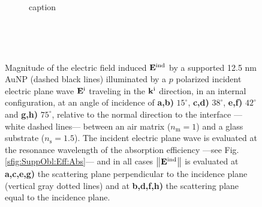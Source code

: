  \begin{figure}\centering
    \def\svgwidth{.7\textwidth}
    \scriptsize
    \\[-62.75em]
    \hspace*{-.255\textwidth}
        \begin{subfigure}{.25\textwidth}\caption{ } \label{sfig:Near:SuppObl:p:15:perp}\end{subfigure}%
        \begin{subfigure}{.3\textwidth}\caption{ }\label{sfig:Near:SuppObl:p:15:par}\end{subfigure}\\[12.8em]
    \hspace*{-.225\textwidth}
        \begin{subfigure}{.225\textwidth}\caption{ } \label{sfig:Near:SuppObl:p:38:perp}\end{subfigure}%
        \begin{subfigure}{.34\textwidth}\caption{ }\label{sfig:Near:SuppObl:p:38:par}\end{subfigure}\\[12.8em]
    \hspace*{-.225\textwidth}
        \begin{subfigure}{.225\textwidth}caption{ } \label{sfig:Near:SuppObl:p:42:perp}\end{subfigure}%
        \begin{subfigure}{.34\textwidth}\caption{ }\label{sfig:Near:SuppObl:p:42:par}\end{subfigure}\\[12.8em]
    \hspace*{-.225\textwidth}
        \begin{subfigure}{.225\textwidth}\caption{ } \label{sfig:Near:SuppObl:p:75:perp}\end{subfigure}%
        \begin{subfigure}{.34\textwidth}\caption{ }\label{sfig:Near:SuppObl:p:75:par}\end{subfigure}\\[15.75em]
    \caption[Induced Electric Field of a 12.5 nm Au NP on substrate illuminated at oblique incidence with a $p$ polarized electric field]{\footnotesize%
    Magnitude of the electric field induced $\vb{E}^\text{ind}$ by a supported 12.5 nm AuNP (dashed black lines) illuminated by a $p$ polarized incident electric plane wave $\vb{E}^\text{i}$ traveling in the $\vb{k}^\text{i}$ direction, in an internal configuration, at an angle of incidence of \textbf{a,b)} $15^\circ$, \textbf{c,d)} $38^\circ$, \textbf{e,f)} $42^\circ$ and \textbf{g,h)} $75^\circ$, relative to the normal direction to the interface ---white dashed lines--- between an air matrix ($n_\text{m} = 1$) and a glass substrate ($n_\text{s} = 1.5$). The incident electric plane wave is evaluated at the resonance wavelength of the absorption efficiency ---see Fig. \ref{sfig:SuppObl:Eff:Abs}--- and in all cases $\norm{\vb{E}^\text{ind}}$ is evaluated at  \textbf{a,c,e,g)} the scattering plane perpendicular to the incidence plane (vertical gray dotted lines) and at \textbf{b,d,f,h)} the scattering plane equal to the incidence plane.
}
\end{figure}
